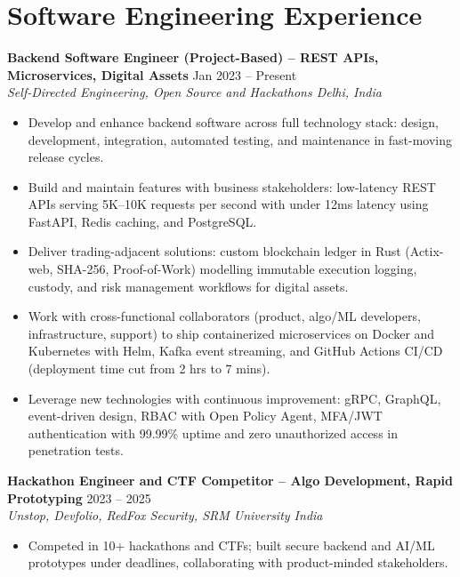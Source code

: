 \documentclass[9pt,letterpaper]{article}
\begin{document}
\section{Software Engineering Experience}
\textbf{Backend Software Engineer (Project-Based) -- REST APIs, Microservices, Digital Assets} \hfill Jan 2023 -- Present\\
\textit{Self-Directed Engineering, Open Source and Hackathons \textbar{} Delhi, India}
\begin{itemize}
\item Develop and enhance backend software across full technology stack: design, development, integration, automated testing, and maintenance in fast-moving release cycles.
\item Build and maintain features with business stakeholders: low-latency REST APIs serving 5K--10K requests per second with under 12ms latency using FastAPI, Redis caching, and PostgreSQL.
\item Deliver trading-adjacent solutions: custom blockchain ledger in Rust (Actix-web, SHA-256, Proof-of-Work) modelling immutable execution logging, custody, and risk management workflows for digital assets.
\item Work with cross-functional collaborators (product, algo/ML developers, infrastructure, support) to ship containerized microservices on Docker and Kubernetes with Helm, Kafka event streaming, and GitHub Actions CI/CD (deployment time cut from 2 hrs to 7 mins).
\item Leverage new technologies with continuous improvement: gRPC, GraphQL, event-driven design, RBAC with Open Policy Agent, MFA/JWT authentication with 99.99\% uptime and zero unauthorized access in penetration tests.
\end{itemize}
\textbf{Hackathon Engineer and CTF Competitor -- Algo Development, Rapid Prototyping} \hfill 2023 -- 2025\\
\textit{Unstop, Devfolio, RedFox Security, SRM University \textbar{} India}
\begin{itemize}
\item Competed in 10+ hackathons and CTFs; built secure backend and AI/ML prototypes under deadlines, collaborating with product-minded stakeholders.
\end{itemize}

\end{document}
